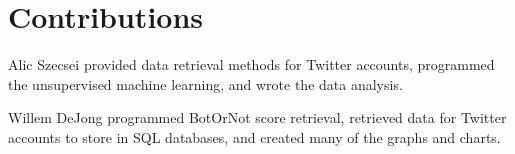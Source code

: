 \documentclass{sig-alternate-05-2015}
\begin{document}
%

%
%

\appendix
\section{Contributions}
Alic Szecsei provided data retrieval methods for Twitter accounts, programmed the unsupervised machine learning, and wrote the data analysis.

Willem DeJong programmed BotOrNot score retrieval, retrieved data for Twitter accounts to store in SQL databases, and created many of the graphs and charts.

\end{document}
